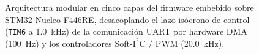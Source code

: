 \begin{figure}[!t]
{\begin{tikzpicture}
\end{tikzpicture}%
}
\caption{Arquitectura modular en cinco capas del firmware embebido sobre STM32 Nucleo-F446RE, desacoplando el lazo is\'ocrono de control (\texttt{TIM6} a \qty{1.0}{\kilo\hertz}) de la comunicaci\'on UART por hardware DMA (\qty{100}{\hertz}) y los controladores Soft-$\text{I}^2\text{C}$ / PWM (\qty{20.0}{\kilo\hertz}).}
\label{fig:arquitectura_firmware}
\end{figure}
